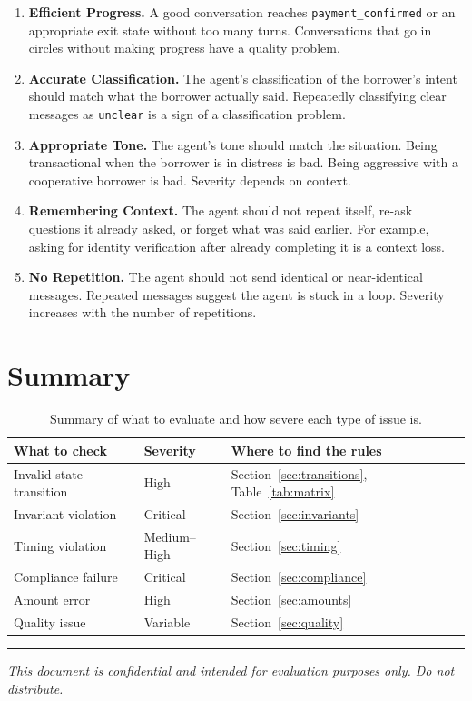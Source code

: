 \documentclass[11pt, a4paper]{article}
\begin{document}
\begin{enumerate}[leftmargin=*, label=\textbf{Q\arabic*.}]

\item \textbf{Efficient Progress.}
A good conversation reaches \texttt{payment\_confirmed} or an appropriate exit state without too many turns. Conversations that go in circles without making progress have a quality problem.

\item \textbf{Accurate Classification.}
The agent's classification of the borrower's intent should match what the borrower actually said. Repeatedly classifying clear messages as \texttt{unclear} is a sign of a classification problem.

\item \textbf{Appropriate Tone.}
The agent's tone should match the situation. Being transactional when the borrower is in distress is bad. Being aggressive with a cooperative borrower is bad. Severity depends on context.

\item \textbf{Remembering Context.}
The agent should not repeat itself, re-ask questions it already asked, or forget what was said earlier. For example, asking for identity verification after already completing it is a context loss.

\item \textbf{No Repetition.}
The agent should not send identical or near-identical messages. Repeated messages suggest the agent is stuck in a loop. Severity increases with the number of repetitions.

\end{enumerate}

\section{Summary}
\label{sec:summary}

\begin{table}[h]
\centering
\begin{tabular}{llp{6cm}}
\toprule
\textbf{What to check} & \textbf{Severity} & \textbf{Where to find the rules} \\
\midrule
Invalid state transition & High & Section~\ref{sec:transitions}, Table~\ref{tab:matrix} \\
Invariant violation & Critical & Section~\ref{sec:invariants} \\
Timing violation & Medium--High & Section~\ref{sec:timing} \\
Compliance failure & Critical & Section~\ref{sec:compliance} \\
Amount error & High & Section~\ref{sec:amounts} \\
Quality issue & Variable & Section~\ref{sec:quality} \\
\bottomrule
\end{tabular}
\caption{Summary of what to evaluate and how severe each type of issue is.}
\end{table}

\vfill
\noindent\rule{\textwidth}{0.4pt}
\small
\textit{This document is confidential and intended for evaluation purposes only. Do not distribute.}
\end{document}
